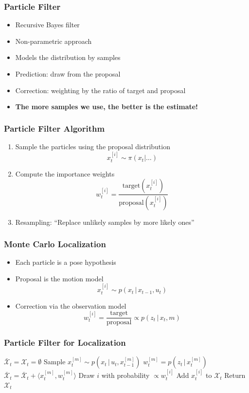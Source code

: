 \begin{frame}
    \frametitle{Particle Filter}
    \begin{itemize}
        \item Recursive Bayes filter
        \item Non-parametric approach
        \item Models the distribution by samples
        \item Prediction: draw from the proposal
        \item Correction: weighting by the ratio of target and proposal
        \item \textbf{The more samples we use, the better is the estimate!}
    \end{itemize}
    \end{frame}
    
    \begin{frame}
    \frametitle{Particle Filter Algorithm}
    \begin{enumerate}
        \item Sample the particles using the proposal distribution
        \[
        x_t^{[i]} \sim \pi(x_t | \ldots)
        \]
        \item Compute the importance weights
        \[
        w_t^{[i]} = \frac{\text{target}(x_t^{[i]})}{\text{proposal}(x_t^{[i]})}
        \]
        \item Resampling: “Replace unlikely samples by more likely ones”
    \end{enumerate}
    \end{frame}
    
    \begin{frame}
    \frametitle{Monte Carlo Localization}
    \begin{itemize}
        \item Each particle is a pose hypothesis
        \item Proposal is the motion model
        \[
        x_t^{[i]} \sim p(x_t \, | \, x_{t-1}, u_t)
        \]
        \item Correction via the observation model
        \[
        w_t^{[i]} = \frac{\text{target}}{\text{proposal}} \propto p(z_t \, | \, x_t, m)
        \]
    \end{itemize}
    \end{frame}
    
    \begin{frame}
    \frametitle{Particle Filter for Localization}
    \begin{algorithmic}[1]
    \State $\bar{\mathcal{X}}_t = \mathcal{X}_t = \emptyset$
        \State Sample $x_t^{[m]} \sim p(x_t \, | \, u_t, x_{t-1}^{[m]})$
        \State $w_t^{[m]} = p(z_t \, | \, x_t^{[m]})$
        \State $\bar{\mathcal{X}}_t = \bar{\mathcal{X}}_t + \langle x_t^{[m]}, w_t^{[m]}\rangle$
    \EndFor
        \State Draw $i$ with probability $\propto w_t^{[i]}$
        \State Add $x_t^{[i]}$ to $\mathcal{X}_t$
    \EndFor
    \State Return $\mathcal{X}_t$
    \end{algorithmic}
    \end{frame}
    
